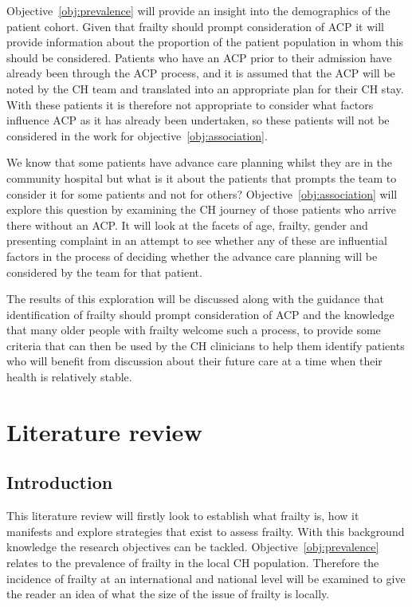\documentclass
[
	12pt,
	a4paper,
	oneside,
]{report}
\begin{document}
Objective~\ref{obj:prevalence} will provide an insight into the demographics
of the patient cohort. Given that frailty should prompt consideration of ACP
it will provide information about the proportion of the patient population in
whom this should be considered. Patients who have an ACP prior to their admission
have already been through the ACP process, and it is assumed that the ACP will be 
noted by the CH team and translated into an appropriate plan for their CH stay.
With these patients it is therefore not appropriate to consider what factors 
influence ACP as it has already been undertaken, so these patients will not
be considered in the work for objective~\ref{obj:association}.

We know that some patients have advance care planning whilst they are in the
community hospital but what is it about the patients that prompts the team to
consider it for some patients and not for others?
Objective~\ref{obj:association} will explore this question by examining the CH
journey of those patients 
who arrive there without an ACP. It will look at the facets of age, frailty, 
gender and presenting complaint in an attempt to see whether any of these are
influential factors in the process of deciding whether the advance care planning
will be considered by the team for that patient.

The results of this exploration will be discussed along with the guidance that 
identification of frailty should prompt consideration of ACP and the knowledge
that many older people with frailty welcome such a process, to provide some 
criteria that can then be used by the CH clinicians to help them identify 
patients who will benefit from discussion about their future care at a time 
when their health is relatively stable.

\chapter{Literature review}

\section{Introduction}

This literature review will firstly look to establish what frailty is, how it
manifests and explore strategies that exist to assess frailty. With this 
background knowledge the research objectives can be tackled. 
Objective~\ref{obj:prevalence} relates to the prevalence of frailty in the
local CH population. Therefore the incidence of frailty at an international
and national level will be examined to give the reader an idea of what the
size of the issue of frailty is locally.
\end{document}

